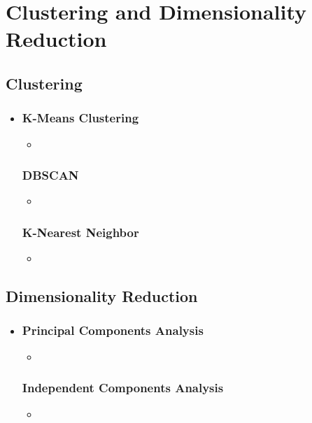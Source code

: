 \chapter{Clustering and Dimensionality Reduction}

\section{Clustering}
\begin{itemize}
  \item []
  
  \subsection{K-Means Clustering}
  \begin{itemize}
    \item 
  \end{itemize}

  \subsection{DBSCAN}
  \begin{itemize}
    \item 
  \end{itemize}

  \subsection{K-Nearest Neighbor}
  \begin{itemize}
    \item 
  \end{itemize}
  
\end{itemize}

\section{Dimensionality Reduction}
\begin{itemize}
  \item []
  
  \subsection{Principal Components Analysis}
  \begin{itemize}
    \item []
  \end{itemize}
    
  \subsection{Independent Components Analysis}
  \begin{itemize}
    \item 
  \end{itemize}
    
\end{itemize}

